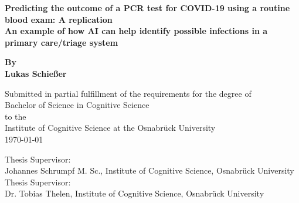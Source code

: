 \begin{titlepage}
	\begin{center}
		\vspace*{1cm}
		\Huge
		\textbf{Predicting the outcome of a PCR test for COVID-19 using a 
routine blood exam: A replication \\} 
		\vspace{0.5cm}
		\Large
		\textbf{An example of how AI can help identify possible infections in a 
primary care/triage system}
		
		\vspace{1cm}
		
		\textbf{By \\ Lukas Schießer}
		
		\vspace{1cm}
		\small
		Submitted in partial fulfillment of the requirements for the degree of \\
		Bachelor of Science in Cognitive Science \\ to the \\
		Institute of Cognitive Science at the Osnabrück University\\
		\today
		
		\vfill
		\vspace{1cm}
		Thesis Supervisor:\\ Johannes Schrumpf M. Sc., Institute of Cognitive 
Science, Osnabrück University \\
		Thesis Supervisor:\\   Dr. Tobias Thelen, Institute of Cognitive 
Science, Osnabrück University
		
		
		
	\end{center}
\end{titlepage}
